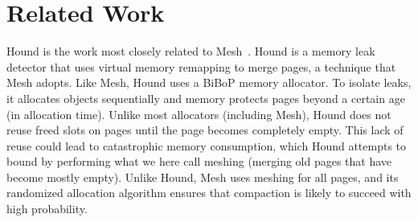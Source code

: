 \section{Related Work}
\label{sec:related}

Hound is the work most closely related to Mesh~\cite{1542521}. Hound
is a memory leak detector that uses virtual memory remapping to merge
pages, a technique that Mesh adopts. Like Mesh, Hound uses a BiBoP
memory allocator. To isolate leaks, it allocates objects sequentially
and memory protects pages beyond a certain age (in allocation
time). Unlike most allocators (including Mesh), Hound does not reuse
freed slots on pages until the page becomes completely empty. This
lack of reuse could lead to catastrophic memory consumption, which
Hound attempts to bound by performing what we here call meshing
(merging old pages that have become mostly empty). Unlike Hound, Mesh
uses meshing for all pages, and its randomized allocation algorithm
ensures that compaction is likely to succeed with high probability.
